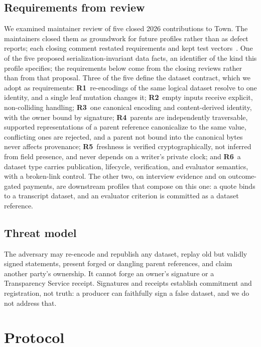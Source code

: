\documentclass[conference]{IEEEtran}
\begin{document}
\subsection{Requirements from review}
We examined maintainer review of five closed 2026 contributions to Town. The maintainers closed them as groundwork for future profiles rather than as defect reports; each closing comment restated requirements and kept test vectors~\cite{prs}. One of the five proposed serialization-invariant data facts, an identifier of the kind this profile specifies; the requirements below come from the closing reviews rather than from that proposal. Three of the five define the dataset contract, which we adopt as requirements:
\textbf{R1}~re-encodings of the same logical dataset resolve to one identity, and a single leaf mutation changes it;
\textbf{R2}~empty inputs receive explicit, non-colliding handling;
\textbf{R3}~one canonical encoding and content-derived identity, with the owner bound by signature;
\textbf{R4}~parents are independently traversable, supported representations of a parent reference canonicalize to the same value, conflicting ones are rejected, and a parent not bound into the canonical bytes never affects provenance;
\textbf{R5}~freshness is verified cryptographically, not inferred from field presence, and never depends on a writer's private clock; and
\textbf{R6}~a dataset type carries publication, lifecycle, verification, and evaluator semantics, with a broken-link control.
The other two, on interview evidence and on outcome-gated payments, are downstream profiles that compose on this one: a quote binds to a transcript dataset, and an evaluator criterion is committed as a dataset reference.

\subsection{Threat model}
The adversary may re-encode and republish any dataset, replay old but validly signed statements, present forged or dangling parent references, and claim another party's ownership. It cannot forge an owner's signature or a Transparency Service receipt. Signatures and receipts establish commitment and registration, not truth: a producer can faithfully sign a false dataset, and we do not address that.

\section{Protocol}
\end{document}
